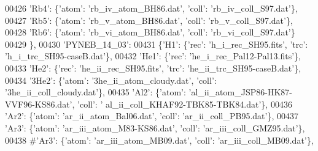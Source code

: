 \begin{DoxyCode}
00426                              \textcolor{stringliteral}{'Rb4'}: \{\textcolor{stringliteral}{'atom'}: \textcolor{stringliteral}{'rb\_iv\_atom\_BH86.dat'}, \textcolor{stringliteral}{'coll'}: \textcolor{stringliteral}{'rb\_iv\_coll\_S97.dat'}\},
00427                              \textcolor{stringliteral}{'Rb5'}: \{\textcolor{stringliteral}{'atom'}: \textcolor{stringliteral}{'rb\_v\_atom\_BH86.dat'}, \textcolor{stringliteral}{'coll'}: \textcolor{stringliteral}{'rb\_v\_coll\_S97.dat'}\},
00428                              \textcolor{stringliteral}{'Rb6'}: \{\textcolor{stringliteral}{'atom'}: \textcolor{stringliteral}{'rb\_vi\_atom\_BH86.dat'}, \textcolor{stringliteral}{'coll'}: \textcolor{stringliteral}{'rb\_vi\_coll\_S97.dat'}\}
00429                              \},
00430                            \textcolor{stringliteral}{'PYNEB\_14\_03'}:
00431                             \{\textcolor{stringliteral}{'H1'}: \{\textcolor{stringliteral}{'rec'}: \textcolor{stringliteral}{'h\_i\_rec\_SH95.fits'}, \textcolor{stringliteral}{'trc'}: \textcolor{stringliteral}{'h\_i\_trc\_SH95-caseB.dat'}\},
00432                              \textcolor{stringliteral}{'He1'}: \{\textcolor{stringliteral}{'rec'}: \textcolor{stringliteral}{'he\_i\_rec\_Pal12-Pal13.fits'}\},
00433                              \textcolor{stringliteral}{'He2'}: \{\textcolor{stringliteral}{'rec'}: \textcolor{stringliteral}{'he\_ii\_rec\_SH95.fits'}, \textcolor{stringliteral}{'trc'}: \textcolor{stringliteral}{'he\_ii\_trc\_SH95-caseB.dat'}\},
00434                              \textcolor{stringliteral}{'3He2'}: \{\textcolor{stringliteral}{'atom'}: \textcolor{stringliteral}{'3he\_ii\_atom\_cloudy.dat'}, \textcolor{stringliteral}{'coll'}: \textcolor{stringliteral}{'3he\_ii\_coll\_cloudy.dat'}\},
00435                              \textcolor{stringliteral}{'Al2'}: \{\textcolor{stringliteral}{'atom'}: \textcolor{stringliteral}{'al\_ii\_atom\_JSP86-HK87-VVF96-KS86.dat'}, \textcolor{stringliteral}{'coll'}: \textcolor{stringliteral}{'
      al\_ii\_coll\_KHAF92-TBK85-TBK84.dat'}\},
00436                              \textcolor{stringliteral}{'Ar2'}: \{\textcolor{stringliteral}{'atom'}: \textcolor{stringliteral}{'ar\_ii\_atom\_Bal06.dat'}, \textcolor{stringliteral}{'coll'}: \textcolor{stringliteral}{'ar\_ii\_coll\_PB95.dat'}\},
00437                              \textcolor{stringliteral}{'Ar3'}: \{\textcolor{stringliteral}{'atom'}: \textcolor{stringliteral}{'ar\_iii\_atom\_M83-KS86.dat'}, \textcolor{stringliteral}{'coll'}: \textcolor{stringliteral}{'ar\_iii\_coll\_GMZ95.dat'}\},
00438                              \textcolor{comment}{#'Ar3': \{'atom': 'ar\_iii\_atom\_MB09.dat', 'coll': 'ar\_iii\_coll\_MB09.dat'\},}

\end{DoxyCode}
